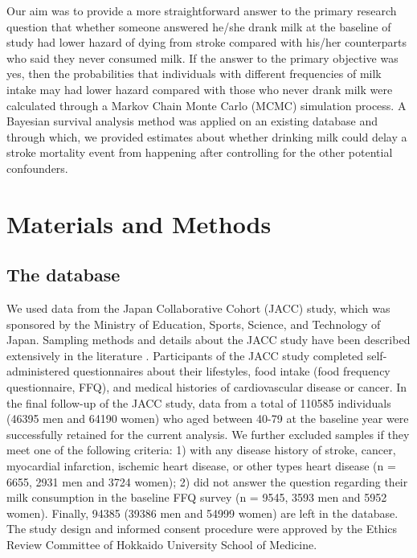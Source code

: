 \documentclass[nutrients,article,submitted,moreauthors,pdftex]{Definitions/mdpi}
\begin{document}
Our aim was to provide a more straightforward answer to the primary
research question that whether someone answered he/she drank milk at the
baseline of study had lower hazard of dying from stroke compared with
his/her counterparts who said they never consumed milk. If the answer to
the primary objective was yes, then the probabilities that individuals
with different frequencies of milk intake may had lower hazard compared
with those who never drank milk were calculated through a Markov Chain
Monte Carlo (MCMC) simulation process. A Bayesian survival analysis
method was applied on an existing database and through which, we
provided estimates about whether drinking milk could delay a stroke
mortality event from happening after controlling for the other potential
confounders.

\hypertarget{materials-and-methods}{%
\section{Materials and Methods}\label{materials-and-methods}}

\hypertarget{the-database}{%
\subsection{The database}\label{the-database}}

We used data from the Japan Collaborative Cohort (JACC) study, which was
sponsored by the Ministry of Education, Sports, Science, and Technology
of Japan. Sampling methods and details about the JACC study have been
described extensively in the literature
\citep{Ohno2001, Tamakoshi2005, Tamakoshi2013}. Participants of the JACC
study completed self-administered questionnaires about their lifestyles,
food intake (food frequency questionnaire, FFQ), and medical histories
of cardiovascular disease or cancer. In the final follow-up of the JACC
study, data from a total of 110585 individuals (46395 men and 64190
women) who aged between 40-79 at the baseline year were successfully
retained for the current analysis. We further excluded samples if they
meet one of the following criteria: 1) with any disease history of
stroke, cancer, myocardial infarction, ischemic heart disease, or other
types heart disease (n = 6655, 2931 men and 3724 women); 2) did not
answer the question regarding their milk consumption in the baseline FFQ
survey (n = 9545, 3593 men and 5952 women). Finally, 94385 (39386 men
and 54999 women) are left in the database. The study design and informed
consent procedure were approved by the Ethics Review Committee of
Hokkaido University School of Medicine.
\end{document}
